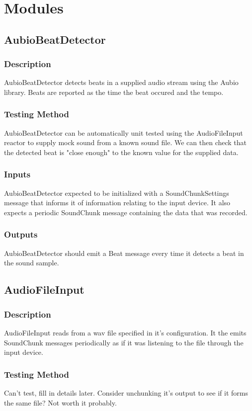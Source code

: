\documentclass[a4paper]{article}
\begin{document}
	
\section{Modules}
	\subsection{AubioBeatDetector}
		\subsubsection{Description}
			AubioBeatDetector detects beats in a supplied audio stream using the Aubio library.
			Beats are reported as the time the beat occured and the tempo.
		\subsubsection{Testing Method}
			AubioBeatDetector can be automatically unit tested using the AudioFileInput reactor to supply mock sound from a known sound file. 
			We can then check that the detected beat is "close enough" to the known value for the supplied data.
		\subsubsection{Inputs}
			AubioBeatDetector expected to be initialized with a SoundChunkSettings message that informs it of information relating to the input device.
			It also expects a periodic SoundChunk message containing the data that was recorded.
		\subsubsection{Outputs}
			AubioBeatDetector should emit a Beat message every time it detects a beat in the sound sample.

	\subsection{AudioFileInput}
		\subsubsection{Description}
			AudioFileInput reads from a wav file specified in it's configuration. 
			It the emits SoundChunk messages periodically as if it was listening to the file through the input device.
		\subsubsection{Testing Method}
			Can't test, fill in details later. Consider unchunking it's output to see if it forms the same file? Not worth it probably.
\end{document}
